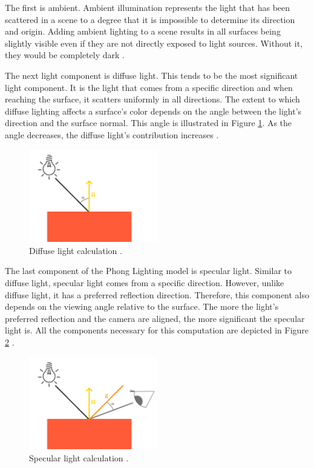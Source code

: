 \documentclass[
  digital,     %
  oneside,     %
  nosansbold,  %
  nocolorbold, %
  lof,         %
  lot,         %
]{fithesis4}
\begin{document}
The first is ambient. Ambient illumination represents the light that has been scattered
in a scene to a degree that it is impossible to determine its direction and origin.
Adding ambient lighting to a scene results in all surfaces being slightly visible
even if they are not directly exposed
to light sources. Without it, they would be completely dark \cite[p.208]{opengl-book}.

The next light component is diffuse light. This tends to be the most significant light component.
It is the light that comes from a specific direction and when reaching the surface,
it scatters uniformly in all directions. The extent to which diffuse lighting affects
a surface's color depends on the angle between the light's direction and the surface normal.
This angle is illustrated in Figure \ref{fig:diffuse}. As the angle decreases,
the diffuse light's contribution increases \cite{phong}\cite[p.208]{opengl-book}.
\begin{figure}[H]
    \centering
    \includegraphics[width=0.5\textwidth]{images/diffuse_light.png}
    \caption{Diffuse light calculation \cite{learnopengl-lighting}.}
    \label{fig:diffuse}
\end{figure}

The last component of the Phong Lighting model is specular light.
Similar to diffuse light, specular light comes from a specific direction.
However, unlike diffuse light, it has a preferred reflection direction.
Therefore, this component also depends on the viewing angle relative to the surface.
The more the light's preferred reflection and the camera are aligned, the
more significant the specular light is. All the components necessary for this
computation are depicted in Figure \ref{fig:specular} \cite{phong}\cite[p.208]{opengl-book}.
\begin{figure}[H]
    \centering
    \includegraphics[width=0.5\textwidth]{images/specular_light.png}
    \caption{Specular light calculation \cite{learnopengl-lighting}.}
    \label{fig:specular}
\end{figure}
\end{document}
